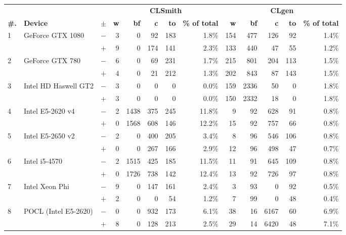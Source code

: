   \begin{tabular}{lll | rrrrr | rrrrr }
  \toprule
  & & & \multicolumn{5}{c|}{\textbf{CLSmith}} & \multicolumn{5}{c}{\textbf{CLgen}} \\
  \textbf{\#.} & \textbf{Device} & $\pm$ &
  \textbf{w} & \textbf{bf} & \textbf{c} & \textbf{to} & \textbf{\% of total} &
  \textbf{w} & \textbf{bf} & \textbf{c} & \textbf{to} & \textbf{\% of total} \\
  \midrule
  \multirow{ 2}{*}{1} & \multirow{ 2}{*}{GeForce GTX 1080} & $-$ & 3 & 0 & 92 & 183 & 1.8\%       & 154 & 477 & 126 & 92 & 1.4\% \\& & $+$ & 9 & 0 & 174 & 141 & 2.3\% & 133 & 440 & 47 & 55 & 1.2\% \\
\hline
\multirow{ 2}{*}{2} & \multirow{ 2}{*}{GeForce GTX 780} & $-$ & 6 & 0 & 69 & 231 & 1.7\%       & 215 & 801 & 204 & 113 & 1.5\% \\& & $+$ & 4 & 0 & 21 & 212 & 1.3\% & 202 & 843 & 87 & 143 & 1.5\% \\
\hline
\multirow{ 2}{*}{3} & \multirow{ 2}{*}{Intel HD Haswell GT2} & $-$ & 3 & 0 & 0 & 0 & 0.0\%       & 159 & 2336 & 50 & 0 & 1.8\% \\& & $+$ & 3 & 0 & 0 & 0 & 0.0\% & 150 & 2332 & 18 & 0 & 1.8\% \\
\hline
\multirow{ 2}{*}{4} & \multirow{ 2}{*}{Intel E5-2620 v4} & $-$ & 2 & 1438 & 375 & 245 & 11.8\%       & 9 & 92 & 628 & 91 & 0.8\% \\& & $+$ & 0 & 1568 & 608 & 146 & 12.2\% & 15 & 92 & 757 & 66 & 0.8\% \\
\hline
\multirow{ 2}{*}{5} & \multirow{ 2}{*}{Intel E5-2650 v2} & $-$ & 2 & 0 & 400 & 205 & 3.4\%       & 8 & 96 & 546 & 106 & 0.8\% \\& & $+$ & 0 & 0 & 267 & 166 & 2.9\% & 12 & 96 & 498 & 47 & 0.7\% \\
\hline
\multirow{ 2}{*}{6} & \multirow{ 2}{*}{Intel i5-4570} & $-$ & 2 & 1515 & 425 & 185 & 11.5\%       & 11 & 91 & 645 & 109 & 0.8\% \\& & $+$ & 0 & 1726 & 738 & 142 & 12.4\% & 13 & 92 & 726 & 97 & 0.8\% \\
\hline
\multirow{ 2}{*}{7} & \multirow{ 2}{*}{Intel Xeon Phi} & $-$ & 9 & 0 & 147 & 161 & 2.4\%       & 3 & 93 & 0 & 92 & 0.5\% \\& & $+$ & 2 & 0 & 0 & 54 & 1.2\% & 7 & 99 & 0 & 48 & 0.4\% \\
\hline
\multirow{ 2}{*}{8} & \multirow{ 2}{*}{POCL (Intel E5-2620)} & $-$ & 0 & 0 & 932 & 173 & 6.1\%       & 38 & 16 & 6167 & 60 & 6.9\% \\& & $+$ & 8 & 0 & 128 & 213 & 2.5\% & 29 & 14 & 6420 & 48 & 7.1\% \\

\end{tabular}

